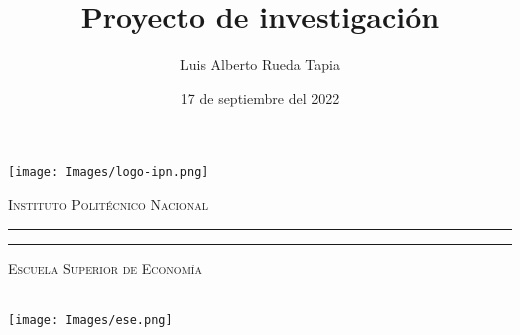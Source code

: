 \documentclass[letterpaper,12pt,oneside]{book}
\title{Proyecto de investigación}
\author{Luis Alberto Rueda Tapia}
\date{17 de septiembre del 2022}
\begin{document}
\begin{titlepage}
  \thispagestyle{empty}
  \begin{minipage}[c][0.17\textheight][c]{0.25\textwidth}
    \begin{center}
      \texttt{[image: Images/logo-ipn.png]}
    \end{center}
  \end{minipage}
  \begin{minipage}[c][0.195\textheight][t]{0.75\textwidth}
    \begin{center}
      \vspace{0.3cm}
             {\color{red}\textsc{\large Instituto Politécnico Nacional} }\\[0.5cm]
             \vspace{0.3cm}
                    {\color{purple}\hrule height2.5pt}
                    \vspace{.2cm}
                           {\color{purple}\hrule height1pt}
                           \vspace{.8cm}
                           \textsc{Escuela Superior de Economía}\\[1cm] %
    \end{center}
  \end{minipage}
  \begin{minipage}[c][0.81\textheight][t]{0.25\textwidth}
    \vspace*{5mm}
    \begin{center}
      \hskip2.0mm
             {\color{red}\vrule width1pt height13cm }
             \vspace{5mm}
             \hskip2pt
                 {\color{red}\vrule width2.5pt height13cm}
                 \hskip2mm
                     {\color{red}\vrule width1pt height13cm} \\
                     \vspace{5mm}
                     \texttt{[image: Images/ese.png]}
    \end{center}
  \end{minipage}
  \begin{minipage}[c][0.81\textheight][t]{0.75\textwidth}
    \begin{center}
      \vspace{1cm}

      {\color{red}{\large\scshape Información asimétrica: Una aplicación de redes neuronales en México. 2015-2022. }}\\[.2in]


\end{center}
\end{minipage}
\end{titlepage}
\end{document}
